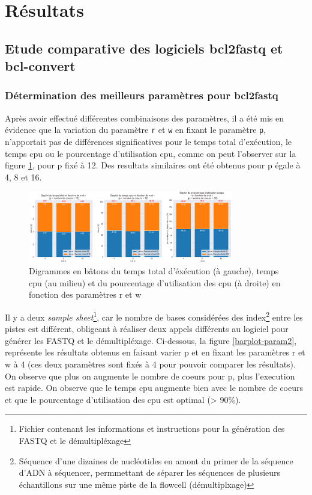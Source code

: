 \section{Résultats}
\subsection{Etude comparative des logiciels bcl2fastq et bcl-convert}
\subsubsection*{Détermination des meilleurs paramètres pour bcl2fastq}
Après avoir effectué différentes combinaisons des paramètres, il a été mis en évidence que la variation du paramètre \texttt{r} et \texttt{w} en fixant le paramètre \texttt{p}, n'apportait pas de différences significatives pour le temps total d'exécution, le temps cpu ou le pourcentage d'utilisation cpu, comme on peut l'observer sur la figure \ref{barplot-param}, pour p fixé à 12. Des resultats similaires ont été obtenus pour p égale à 4, 8 et 16. 

\begin{figure}[H]
    \centering
    \includegraphics[width=0.8\textwidth]{img/barplot_cum_jarvis2.png}
    \caption{\footnotesize{Digrammes en bâtons du temps total d'éxécution (à gauche), temps cpu (au milieu) et du pourcentage d'utilisation des cpu (à droite) en fonction des paramètres r et w}}
    \label{barplot-param}
\end{figure}

Il y a deux \emph{sample sheet}\footnote{Fichier contenant les informations et instructions pour la génération des FASTQ et le démultipléxage}, car le nombre de bases considérées des index\footnote{Séquence d'une dizaines de nucléotides en amont du primer de la séquence d'ADN à séquencer, permmettant de séparer les séquences de plusieurs échantillons sur une même piste de la flowcell (démultiplxage)} entre les pistes est différent, obligeant à réaliser deux appels différents au logiciel pour générer les FASTQ et le démultipléxage. Ci-dessous, la figure \ref{barplot-param2}, représente les résultats obtenus en faisant varier p et en fixant les paramètres r et w à 4 (ces deux paramètres sont fixés à 4 pour pouvoir comparer les résultats). On observe que plus on augmente le nombre de coeurs pour p, plus l'execution est rapide. On observe que le temps cpu augmente bien avec le nombre de coeurs et que le pourcentage d'utilisation des cpu est optimal (> 90\%).

